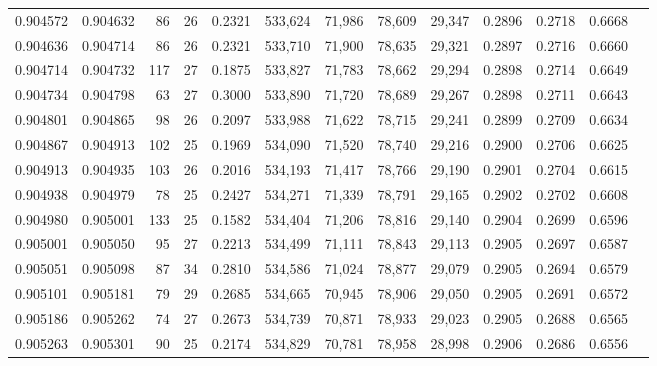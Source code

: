 \begin{tabular}{rrrrrrrrrrrrr}
0.904572 & 0.904632 &    86 &  26 &                                     0.2321 & 533,624 &  71,986 &  78,609 &  29,347 & 0.2896 & 0.2718 & 0.6668 \\
0.904636 & 0.904714 &    86 &  26 &                                     0.2321 & 533,710 &  71,900 &  78,635 &  29,321 & 0.2897 & 0.2716 & 0.6660 \\
0.904714 & 0.904732 &   117 &  27 &                                     0.1875 & 533,827 &  71,783 &  78,662 &  29,294 & 0.2898 & 0.2714 & 0.6649 \\
0.904734 & 0.904798 &    63 &  27 &                                     0.3000 & 533,890 &  71,720 &  78,689 &  29,267 & 0.2898 & 0.2711 & 0.6643 \\
0.904801 & 0.904865 &    98 &  26 &                                     0.2097 & 533,988 &  71,622 &  78,715 &  29,241 & 0.2899 & 0.2709 & 0.6634 \\
0.904867 & 0.904913 &   102 &  25 &                                     0.1969 & 534,090 &  71,520 &  78,740 &  29,216 & 0.2900 & 0.2706 & 0.6625 \\
0.904913 & 0.904935 &   103 &  26 &                                     0.2016 & 534,193 &  71,417 &  78,766 &  29,190 & 0.2901 & 0.2704 & 0.6615 \\
0.904938 & 0.904979 &    78 &  25 &                                     0.2427 & 534,271 &  71,339 &  78,791 &  29,165 & 0.2902 & 0.2702 & 0.6608 \\
0.904980 & 0.905001 &   133 &  25 &                                     0.1582 & 534,404 &  71,206 &  78,816 &  29,140 & 0.2904 & 0.2699 & 0.6596 \\
0.905001 & 0.905050 &    95 &  27 &                                     0.2213 & 534,499 &  71,111 &  78,843 &  29,113 & 0.2905 & 0.2697 & 0.6587 \\
0.905051 & 0.905098 &    87 &  34 &                                     0.2810 & 534,586 &  71,024 &  78,877 &  29,079 & 0.2905 & 0.2694 & 0.6579 \\
0.905101 & 0.905181 &    79 &  29 &                                     0.2685 & 534,665 &  70,945 &  78,906 &  29,050 & 0.2905 & 0.2691 & 0.6572 \\
0.905186 & 0.905262 &    74 &  27 &                                     0.2673 & 534,739 &  70,871 &  78,933 &  29,023 & 0.2905 & 0.2688 & 0.6565 \\
0.905263 & 0.905301 &    90 &  25 &                                     0.2174 & 534,829 &  70,781 &  78,958 &  28,998 & 0.2906 & 0.2686 & 0.6556 \\

\end{tabular}
